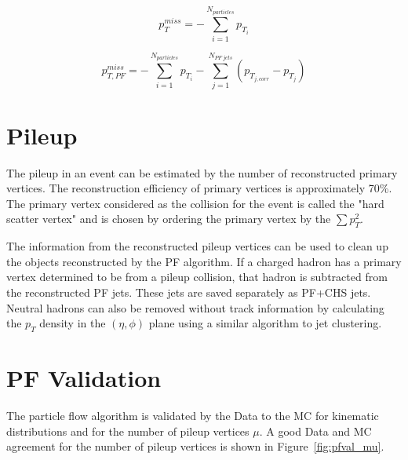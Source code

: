 \begin{equation}
	p^{miss}_{T}   = -\sum_{i=1}^{N_{particles}} p_{T_{i}}
	\label{eq:ptmiss}
\end{equation}

\begin{equation}
	p^{miss}_{T,PF}   = -\sum_{i=1}^{N_{particles}} p_{T_{i}} - \sum_{j=1}^{N_{PF\ jets}} (p_{T_{j,corr}} - p_{T_{j}})
	\label{eq:ptmiss_corr}
\end{equation}

\section{Pileup}

The pileup in an event can be estimated by the number of reconstructed primary vertices. The reconstruction efficiency of primary vertices is approximately 70\%. The primary vertex considered as the collision for the event is called the "hard scatter vertex" and is chosen by ordering the primary vertex by the $\sum p_{T}^2$.

The information from the reconstructed pileup vertices can be used to clean up the objects reconstructed by the PF algorithm. If a charged hadron has a primary vertex determined to be from a pileup collision, that hadron is subtracted from the reconstructed PF jets. These jets are saved separately as PF+CHS jets. Neutral hadrons can also be removed without track information by calculating the $p_T$ density in the $( \eta, \phi )$ plane using a similar algorithm to jet clustering.

\section{PF Validation}

The particle flow algorithm is validated by the Data to the MC for kinematic distributions and for the number of pileup vertices $\mu$. A good Data and MC agreement for the number of pileup vertices is shown in Figure~\ref{fig:pfval_mu}.


